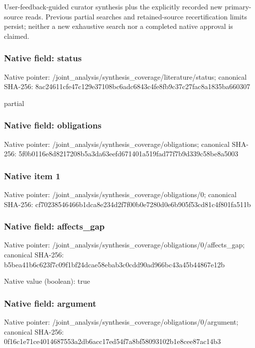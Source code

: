 \documentclass[10pt,a4paper]{article}
\begin{document}
\begingroup\raggedright\sloppy User-feedback-guided curator synthesis plus the explicitly recorded new primary-source reads. Previous partial searches and retained-source recertification limits persist;\allowbreak{} neither a new exhaustive search nor a completed native approval is claimed.\par\endgroup

\subsubsection{Native field: status}
Native pointer: /joint\_\allowbreak{}analysis/synthesis\_\allowbreak{}coverage/literature/status; canonical SHA-256: 8ac24611cfe47c129e37108bc6adc6843c4fe8fb9c37c27fac8a1835ba660307

\begingroup\raggedright\sloppy partial\par\endgroup

\subsubsection{Native field: obligations}
Native pointer: /joint\_\allowbreak{}analysis/synthesis\_\allowbreak{}coverage/obligations; canonical SHA-256: 5f0b0116e8d8217208b5a3da63eefd671401a519fad77f7b9d339c58be8a5003

\subsubsection{Native item 1}
Native pointer: /joint\_\allowbreak{}analysis/synthesis\_\allowbreak{}coverage/obligations/0; canonical SHA-256: cf70238546466b1dca8e234d2f7f00b0e7280d0e6b905f53cd81c4f801fa511b

\subsubsection{Native field: affects\_\allowbreak{}gap}
Native pointer: /joint\_\allowbreak{}analysis/synthesis\_\allowbreak{}coverage/obligations/0/affects\_\allowbreak{}gap; canonical SHA-256: b5bea41b6c623f7c09f1bf24dcae58ebab3c0cdd90ad966bc43a45b44867e12b

Native value (boolean): true

\subsubsection{Native field: argument}
Native pointer: /joint\_\allowbreak{}analysis/synthesis\_\allowbreak{}coverage/obligations/0/argument; canonical SHA-256: 0f16c1e71ce4014687553a2db6acc17ed54f7a8bf58093102b1e8cee87ac14b3
\end{document}
